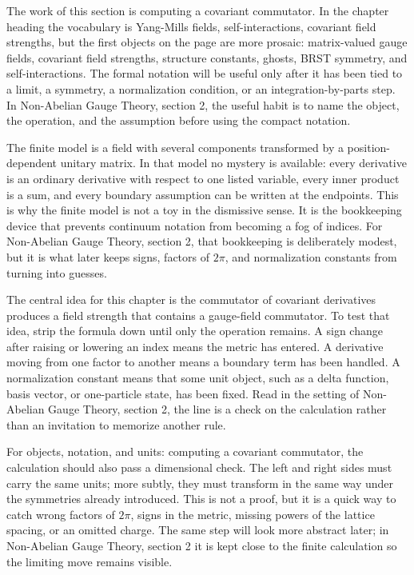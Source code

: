 The work of this section is computing a covariant commutator.  In the chapter heading the vocabulary is Yang-Mills fields, self-interactions, covariant field strengths, but the first objects on the page are more prosaic: matrix-valued gauge fields, covariant field strengths, structure constants, ghosts, BRST symmetry, and self-interactions.  The formal notation will be useful only after it has been tied to a limit, a symmetry, a normalization condition, or an integration-by-parts step.  In Non-Abelian Gauge Theory, section 2, the useful habit is to name the object, the operation, and the assumption before using the compact notation.

The finite model is a field with several components transformed by a position-dependent unitary matrix.  In that model no mystery is available: every derivative is an ordinary derivative with respect to one listed variable, every inner product is a sum, and every boundary assumption can be written at the endpoints.  This is why the finite model is not a toy in the dismissive sense.  It is the bookkeeping device that prevents continuum notation from becoming a fog of indices.  For Non-Abelian Gauge Theory, section 2, that bookkeeping is deliberately modest, but it is what later keeps signs, factors of \(2\pi\), and normalization constants from turning into guesses.

The central idea for this chapter is the commutator of covariant derivatives produces a field strength that contains a gauge-field commutator.  To test that idea, strip the formula down until only the operation remains.  A sign change after raising or lowering an index means the metric has entered.  A derivative moving from one factor to another means a boundary term has been handled.  A normalization constant means that some unit object, such as a delta function, basis vector, or one-particle state, has been fixed.  Read in the setting of Non-Abelian Gauge Theory, section 2, the line is a check on the calculation rather than an invitation to memorize another rule.

For objects, notation, and units: computing a covariant commutator, the calculation should also pass a dimensional check.  The left and right sides must carry the same units; more subtly, they must transform in the same way under the symmetries already introduced.  This is not a proof, but it is a quick way to catch wrong factors of \(2\pi\), signs in the metric, missing powers of the lattice spacing, or an omitted charge.  The same step will look more abstract later; in Non-Abelian Gauge Theory, section 2 it is kept close to the finite calculation so the limiting move remains visible.

